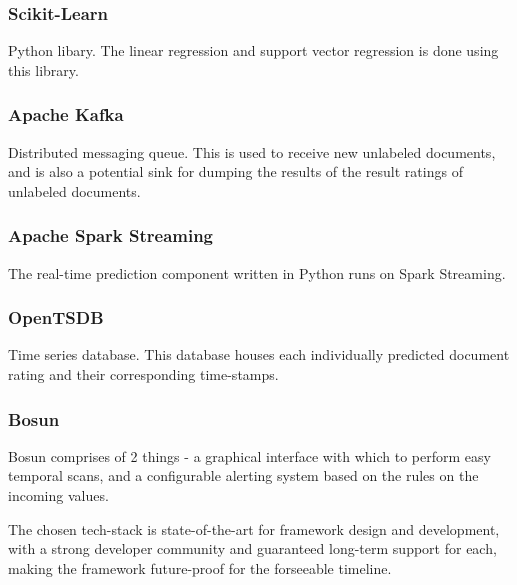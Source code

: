 \documentclass[conference]{IEEEtran}
\begin{document}
        \subsubsection{Scikit-Learn}
        Python libary. The linear regression and support vector regression is done using this library\cite{scikit_learn}.
        
        \subsubsection{Apache Kafka}
        Distributed messaging queue. This is used to receive new unlabeled documents, and is also a potential sink for dumping the results of the result ratings of unlabeled documents\cite{kreps2011kafka}.
        
        \subsubsection{Apache Spark Streaming}
        The real-time prediction component written in Python runs on Spark Streaming\cite{zaharia2012discretized}.
        
        \subsubsection{OpenTSDB}
        Time series database. This database houses each individually predicted document rating and their corresponding time-stamps\cite{opentsdb}.
        
        \subsubsection{Bosun}
        Bosun comprises of 2 things - a graphical interface with which to perform easy temporal scans, and a configurable alerting system based on the rules on the incoming values\cite{bosun_repo}. 

The chosen tech-stack is state-of-the-art for framework design and development, with a strong developer community and guaranteed long-term support for each, making the framework future-proof for the forseeable timeline.
\end{document}
